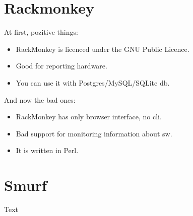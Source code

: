 \documentclass[12pt]{article}
\begin{document}
\section{Rackmonkey}
At first, pozitive things:
\begin{itemize}
\item RackMonkey is licenced under the GNU Public Licence.
\item Good for reporting hardware.
\item You can use it with Postgres/MySQL/SQLite db.
\end{itemize}


And now the bad ones:
\begin{itemize}
\item RackMonkey has only browser interface, no cli.
\item Bad support for monitoring information about sw.
\item It is written in Perl.
\end{itemize}

\section{Smurf}
Text
\end{document}
